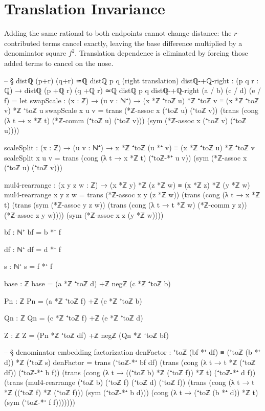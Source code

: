 \documentclass[11pt,a4paper]{book}
\begin{document}
\section{Translation Invariance}

Adding the same rational to both endpoints cannot change distance: the
$r$-contributed terms cancel exactly, leaving the base difference
multiplied by a denominator square $f^2$. Translation
dependence is eliminated by forcing those added terms to cancel on the nose.

\begin{code}
-- § distℚ (p+r) (q+r) ≃ℚ distℚ p q (right translation)
distℚ-+ℚ-right : (p q r : ℚ) → distℚ (p +ℚ r) (q +ℚ r) ≃ℚ distℚ p q
distℚ-+ℚ-right (a / b) (c / d) (e / f) =
  let
    swapScale : (x : ℤ) → (u v : ℕ⁺) → (x *ℤ ⁺toℤ u) *ℤ ⁺toℤ v ≡ (x *ℤ ⁺toℤ v) *ℤ ⁺toℤ u
    swapScale x u v =
      trans
        (*ℤ-assoc x (⁺toℤ u) (⁺toℤ v))
        (trans
          (cong (λ t → x *ℤ t) (*ℤ-comm (⁺toℤ u) (⁺toℤ v)))
          (sym (*ℤ-assoc x (⁺toℤ v) (⁺toℤ u))))

    scaleSplit : (x : ℤ) → (u v : ℕ⁺) → x *ℤ ⁺toℤ (u *⁺ v) ≡ (x *ℤ ⁺toℤ u) *ℤ ⁺toℤ v
    scaleSplit x u v =
      trans
        (cong (λ t → x *ℤ t) (⁺toℤ-*⁺ u v))
        (sym (*ℤ-assoc x (⁺toℤ u) (⁺toℤ v)))

    mul4-rearrange : (x y z w : ℤ) → (x *ℤ y) *ℤ (z *ℤ w) ≡ (x *ℤ z) *ℤ (y *ℤ w)
    mul4-rearrange x y z w =
      trans
        (*ℤ-assoc x y (z *ℤ w))
        (trans
          (cong (λ t → x *ℤ t)
            (trans
              (sym (*ℤ-assoc y z w))
              (trans
                (cong (λ t → t *ℤ w) (*ℤ-comm y z))
                (*ℤ-assoc z y w))))
          (sym (*ℤ-assoc x z (y *ℤ w))))

    bf : ℕ⁺
    bf = b *⁺ f

    df : ℕ⁺
    df = d *⁺ f

    s : ℕ⁺
    s = f *⁺ f

    base : ℤ
    base = (a *ℤ ⁺toℤ d) +ℤ negℤ (c *ℤ ⁺toℤ b)

    Pn : ℤ
    Pn = (a *ℤ ⁺toℤ f) +ℤ (e *ℤ ⁺toℤ b)

    Qn : ℤ
    Qn = (c *ℤ ⁺toℤ f) +ℤ (e *ℤ ⁺toℤ d)

    Z : ℤ
    Z = (Pn *ℤ ⁺toℤ df) +ℤ negℤ (Qn *ℤ ⁺toℤ bf)

    -- § denominator embedding factorization
    denFactor : ⁺toℤ (bf *⁺ df) ≡ (⁺toℤ (b *⁺ d)) *ℤ (⁺toℤ s)
    denFactor =
      trans
        (⁺toℤ-*⁺ bf df)
        (trans
          (cong (λ t → t *ℤ (⁺toℤ df)) (⁺toℤ-*⁺ b f))
          (trans
            (cong (λ t → ((⁺toℤ b) *ℤ (⁺toℤ f)) *ℤ t) (⁺toℤ-*⁺ d f))
            (trans
              (mul4-rearrange (⁺toℤ b) (⁺toℤ f) (⁺toℤ d) (⁺toℤ f))
              (trans
                (cong (λ t → t *ℤ ((⁺toℤ f) *ℤ (⁺toℤ f))) (sym (⁺toℤ-*⁺ b d)))
                (cong (λ t → (⁺toℤ (b *⁺ d)) *ℤ t) (sym (⁺toℤ-*⁺ f f)))))))


\end{code}
\end{document}
